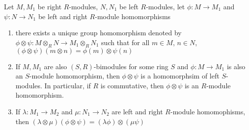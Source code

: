 \begin{theorem}
	Let $M, M_1$ be right $R$-modules, $N, N_1$ be left $R$-modules, let $\phi: M \to M_1$ and $\psi: N \to N_1$ be left and right $R$-module homomorphisms
	\begin{enumerate}
		\item there exists a unique group homomorphism denoted by $\phi \otimes \psi: M \otimes_R N \to M_1 \otimes_R N_1$ such that for all $m \in M$, $n \in N$, $(\phi \otimes \psi) (m \otimes n) = \phi(m) \otimes \psi(n)$
		\begin{center}
		\end{center}
		
		\item If $M, M_1$ are also $(S, R)$-bimodules for some ring $S$ and $\phi: M \to M_1$ is also an $S$-module homomorphism, then $\phi \otimes \psi$ is a homomorphsim of left $S$-modules. In particular, if $R$ is commutative, then $\phi \otimes \psi$ is an $R$-module homomorphism.
		
		\item If $\lambda: M_1 \to M_2$ and $\mu: N_1 \to N_2$ are left and right $R$-module homomophisms, then $(\lambda \otimes \mu) (\phi \otimes \psi) = (\lambda \phi) \otimes (\mu \psi)$
		\begin{center}
		\end{center}
	\end{enumerate}
\end{theorem}

